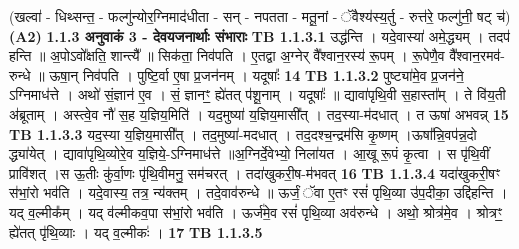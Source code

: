 \documentclass[17pt]{extarticle}
\begin{document}
                  \newline
                                    (खल्वा॑ - धिथ्सन्त॒ - फल्गु॑न्योर॒ग्निमाद॑धीता - सन् - नपतता - मतू॒नां - ॅवैश्य॑स्य॒र्तु - रुत्त॑रे॒ फल्गु॑नी॒ षट् च॑) \textbf{(A2)} \newline \newline
                \textbf{ 1.1.3     अनुवाकं   3 - देवयजनार्थाः संभाराः} \newline
                                \textbf{ TB 1.1.3.1} \newline
                  उद्ध॑न्ति । यदे॒वास्या॑ अमे॒द्ध्यम् । तदप॑ हन्ति ॥ अ॒पोऽवो᳚क्षति॒ शान्त्यै᳚ ॥ सिक॑ता॒ निव॑पति । ए॒तद्वा अ॒ग्नेर् वै᳚श्वान॒रस्य॑ रू॒पम् । रू॒पेणै॒व वै᳚श्वान॒रमव॑-रुन्धे ॥ ऊषा॒न् निव॑पति । पुष्टि॒र्वा ए॒षा प्र॒जन॑नम् । यदूषाः᳚ \textbf{ 14} \newline
                  \newline
                                \textbf{ TB 1.1.3.2} \newline
                  पुष्ट्या॑मे॒व प्र॒जन॑ने॒ ऽग्निमाध॑त्ते । अथो॑ सं॒ज्ञान॑ ए॒व । सं॒ ज्ञानꣳ॒॒ ह्ये॑तत् प॑शू॒नाम् । यदूषाः᳚ ॥ द्यावा॑पृथि॒वी स॒हास्ता᳚म् । ते वि॑य॒ती अ॑ब्रूताम् । अस्त्वे॒व नौ॑ स॒ह य॒ज्ञिय॒मिति॑ । यद॒मुष्या॑ य॒ज्ञिय॒मासी᳚त् । तद॒स्या-म॑दधात् । त ऊषा॑ अभवन्न् \textbf{ 15} \newline
                  \newline
                                \textbf{ TB 1.1.3.3} \newline
                  यद॒स्या य॒ज्ञिय॒मासी᳚त् । तद॒मुष्या॑-मदधात् । तद॒दश्च॒न्द्रम॑सि कृ॒ष्णम् ।ऊषा᳚न्नि॒वप॑न्न॒दो द्ध्या॑येत् । द्यावा॑पृथि॒व्योरे॒व य॒ज्ञिये॒-ऽग्निमाध॑त्ते ॥अ॒ग्निर्दे॒वेभ्यो॒ निला॑यत । आ॒खू रू॒पं कृ॒त्वा । स पृ॑थि॒वीं प्रावि॑शत् ।स ऊ॒तीः कु॑र्वा॒णः पृ॑थि॒वीमनु॒ सम॑चरत् । तदा॑खुकरी॒ष-म॑भवत् \textbf{ 16} \newline
                  \newline
                                \textbf{ TB 1.1.3.4} \newline
                  यदा॑खुकरी॒षꣳ स॑भां॒रो भव॑ति । यदे॒वास्य॒ तत्र॒ न्य॑क्तम् । तदे॒वाव॑रुन्धे ॥ ऊर्जं॒ ॅवा ए॒तꣳ रसं॑ पृथि॒व्या उ॑प॒दीका॒ उद्दि॑हन्ति । यद् व॒ल्मीक᳚म् । यद् व॑ल्मीकव॒पा स॑भां॒रो भव॑ति । ऊर्ज॑मे॒व रसं॑ पृथि॒व्या अव॑रुन्धे । अथो॒ श्रोत्र॑मे॒व । श्रोत्रꣳ॒॒ ह्ये॑तत् पृ॑थि॒व्याः । यद् व॒ल्मीकः॑ । \textbf{ 17} \newline
                  \newline
                                \textbf{ TB 1.1.3.5} \newline
\end{document}
